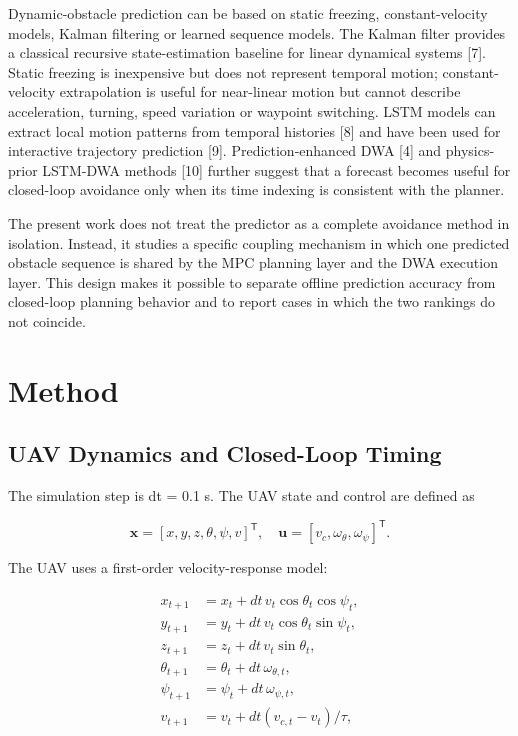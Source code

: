 \documentclass[10pt,a4paper]{article}
\begin{document}
Dynamic-obstacle prediction can be based on static freezing, constant-velocity models, Kalman filtering or learned sequence models. The Kalman filter provides a classical recursive state-estimation baseline for linear dynamical systems [7]. Static freezing is inexpensive but does not represent temporal motion; constant-velocity extrapolation is useful for near-linear motion but cannot describe acceleration, turning, speed variation or waypoint switching. LSTM models can extract local motion patterns from temporal histories [8] and have been used for interactive trajectory prediction [9]. Prediction-enhanced DWA [4] and physics-prior LSTM-DWA methods [10] further suggest that a forecast becomes useful for closed-loop avoidance only when its time indexing is consistent with the planner.

The present work does not treat the predictor as a complete avoidance method in isolation. Instead, it studies a specific coupling mechanism in which one predicted obstacle sequence is shared by the MPC planning layer and the DWA execution layer. This design makes it possible to separate offline prediction accuracy from closed-loop planning behavior and to report cases in which the two rankings do not coincide.

\section{Method}

\subsection{UAV Dynamics and Closed-Loop Timing}

The simulation step is dt = 0.1 s. The UAV state and control are defined as

\[
\mathbf{x}=[x,y,z,\theta,\psi,v]^\mathsf{T},\quad
\mathbf{u}=[v_c,\omega_\theta,\omega_\psi]^\mathsf{T}.
\]

The UAV uses a first-order velocity-response model:

\[
\begin{aligned}
x_{t+1}&=x_t+dt\,v_t\cos\theta_t\cos\psi_t,\\
y_{t+1}&=y_t+dt\,v_t\cos\theta_t\sin\psi_t,\\
z_{t+1}&=z_t+dt\,v_t\sin\theta_t,\\
\theta_{t+1}&=\theta_t+dt\,\omega_{\theta,t},\\
\psi_{t+1}&=\psi_t+dt\,\omega_{\psi,t},\\
v_{t+1}&=v_t+dt(v_{c,t}-v_t)/\tau,
\end{aligned}
\]
\end{document}
